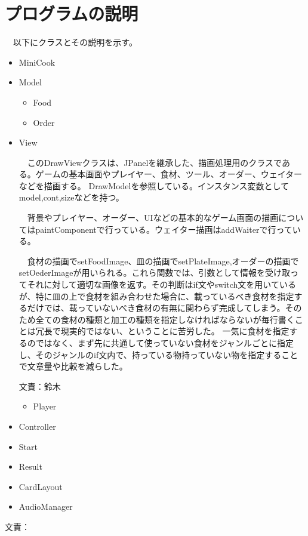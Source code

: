 \documentclass[a4j]{jarticle} %
\begin{document}
\section{プログラムの説明}
　以下にクラスとその説明を示す。
\begin{itemize}
  \item MiniCook\par
  \item Model\par
  \begin{itemize}
    \item Food\par
    \item Order\par
  \end{itemize}   
  \item View\par
  　このDrawViewクラスは、JPanelを継承した、描画処理用のクラスである。ゲームの基本画面やプレイヤー、食材、ツール、オーダー、ウェイターなどを描画する。
  DrawModelを参照している。インスタンス変数としてmodel,cont,sizeなどを持つ。\par
  　背景やプレイヤー、オーダー、UIなどの基本的なゲーム画面の描画についてはpaintComponentで行っている。ウェイター描画はaddWaiterで行っている。\par
  　食材の描画でsetFoodImage、皿の描画でsetPlateImage,オーダーの描画でsetOederImageが用いられる。これら関数では、引数として情報を受け取ってそれに対して適切な画像を返す。その判断はif文やswitch文を用いているが、特に皿の上で食材を組み合わせた場合に、載っているべき食材を指定するだけでは、載っていないべき食材の有無に関わらず完成してしまう。そのため全ての食材の種類と加工の種類を指定しなければならないが毎行書くことは冗長で現実的ではない、ということに苦労した。
  一気に食材を指定するのではなく、まず先に共通して使っていない食材をジャンルごとに指定し、そのジャンルのif文内で、持っている物持っていない物を指定することで文章量や比較を減らした。\par
  文責：鈴木   
  \begin{itemize}
    \item Player\par
  \end{itemize}  
  \item Controller\par
  \item Start\par
  \item Result\par
  \item CardLayout\par
  \item AudioManager\par
\end{itemize}
文責：%
\end{document}
